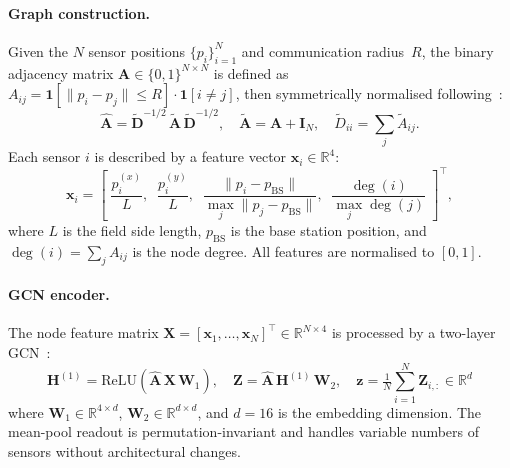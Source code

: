 \documentclass[12pt, onecolumn, journal]{IEEEtran}
\begin{document}
\paragraph{Graph construction.}
Given the $N$ sensor positions $\{p_i\}_{i=1}^N$ and communication radius~$R$, the binary adjacency matrix $\mathbf{A} \in \{0,1\}^{N \times N}$ is defined as $A_{ij} = \mathbf{1}[\|p_i - p_j\| \leq R] \cdot \mathbf{1}[i \neq j]$, then symmetrically normalised following~\cite{kipf2017semi}:
\begin{equation}
    \hat{\mathbf{A}} = \tilde{\mathbf{D}}^{-1/2}\,\tilde{\mathbf{A}}\,\tilde{\mathbf{D}}^{-1/2}, \quad \tilde{\mathbf{A}} = \mathbf{A} + \mathbf{I}_N, \quad \tilde{D}_{ii} = \textstyle\sum_j \tilde{A}_{ij}.
    \label{eq:norm_adj}
\end{equation}
Each sensor $i$ is described by a feature vector $\mathbf{x}_i \in \mathbb{R}^4$:
\begin{equation}
    \mathbf{x}_i = \left[\; \frac{p_i^{(x)}}{L},\;\; \frac{p_i^{(y)}}{L},\;\; \frac{\|p_i - p_{\text{BS}}\|}{\max_j \|p_j - p_{\text{BS}}\|},\;\; \frac{\deg(i)}{\max_j \deg(j)} \;\right]^\top,
    \label{eq:node_features}
\end{equation}
where $L$ is the field side length, $p_{\text{BS}}$ is the base station position, and $\deg(i) = \sum_j A_{ij}$ is the node degree. All features are normalised to $[0, 1]$.

\paragraph{GCN encoder.}
The node feature matrix $\mathbf{X} = [\mathbf{x}_1, \dots, \mathbf{x}_N]^\top \in \mathbb{R}^{N \times 4}$ is processed by a two-layer GCN~\cite{kipf2017semi}:
\begin{equation}
    \mathbf{H}^{(1)} = \text{ReLU}(\hat{\mathbf{A}}\,\mathbf{X}\,\mathbf{W}_1), \quad
    \mathbf{Z} = \hat{\mathbf{A}}\,\mathbf{H}^{(1)}\,\mathbf{W}_2, \quad
    \mathbf{z} = \tfrac{1}{N}\textstyle\sum_{i=1}^{N} \mathbf{Z}_{i,:} \in \mathbb{R}^{d}
    \label{eq:gcn}
\end{equation}
where $\mathbf{W}_1 \in \mathbb{R}^{4 \times d}$, $\mathbf{W}_2 \in \mathbb{R}^{d \times d}$, and $d = 16$ is the embedding dimension. The mean-pool readout is permutation-invariant and handles variable numbers of sensors without architectural changes.
\end{document}
